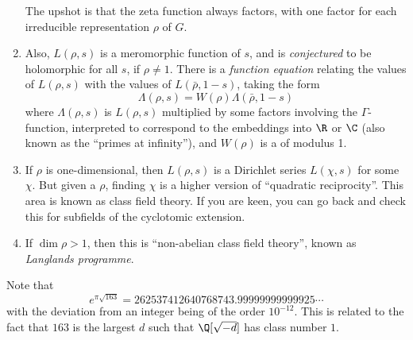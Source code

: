 \documentclass[a4paper]{article}
\begin{document}
\begin{enumerate}
  The upshot is that the zeta function always factors, with one factor for each irreducible representation $\rho$ of $G$.
  \item Also, $L(\rho, s)$ is a meromorphic function of $s$, and is \emph{conjectured} to be holomorphic for all $s$, if $\rho \not= 1$. There is a \emph{function equation} relating the values of $L(\rho,s)$ with the values of $L(\bar{\rho},1-s)$, taking the form
  \[
    \Lambda(\rho,s)=W(\rho)\Lambda(\bar{\rho},1-s)
  \]
  where $\Lambda(\rho,s)$ is $L(\rho,s)$ multiplied by some factors involving the $\Gamma$-function, interpreted to correspond to the embeddings into $\R$ or $\C$ (also known as the ``primes at infinity''), and $W(\rho)$ is a  of modulus 1.
  \item If $\rho$ is one-dimensional, then $L(\rho, s)$ is a Dirichlet series $L(\chi, s)$ for some $\chi$. But given a $\rho$, finding $\chi$ is a higher version of ``quadratic reciprocity''. This area is known as class field theory. If you are keen, you can go back and check this for subfields of the cyclotomic extension.
  \item If $\dim \rho > 1$, then this is ``non-abelian class field theory'', known as \emph{Langlands programme}.
\end{enumerate}

Note that
\[
  e^{\pi\sqrt{163}} = 262537412640768743.99999999999925\cdots
\]
with the deviation from an integer being of the order $10^{-12}$. This is related to the fact that $163$ is the largest $d$ such that $\Q[\sqrt{-d}]$ has class number $1$.
\printindex
\end{document}
